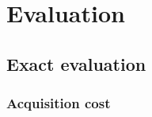 \documentclass[preprint,12pt]{elsarticle}
\begin{document}
% 	
\section{Evaluation}
\subsection{Exact evaluation}

\subsubsection{Acquisition cost}
	
\end{document}
